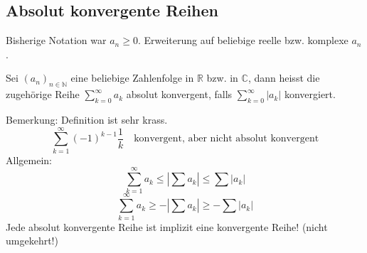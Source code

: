 
\subsection{Absolut konvergente Reihen} %
\label{sub:absolut_konvergente_reihen}

Bisherige Notation war \( a_n \geq 0 \). Erweiterung auf beliebige reelle bzw. komplexe \( a_n \). 

\begin{definition}
	Sei \( (a_n)_{n\in\mathbb{N}} \) eine beliebige Zahlenfolge in \( \mathbb{R} \) bzw. in \( \mathbb{C} \), dann heisst die zugehörige Reihe \( \sum_{k=0}^\infty a_k \) absolut konvergent, falls \( \sum_{k=0}^\infty |a_k| \) konvergiert.
\end{definition}

\noindent Bemerkung: Definition ist sehr krass.
\[
	\sum_{k=1}^\infty(-1)^{k-1}\frac{1}{k} \quad \text{konvergent, aber nicht absolut konvergent}
\]
Allgemein:
\[
	\sum_{k=1}^\infty a_k\leq|\sum a_k| \leq \sum|a_k|
\]
\[
	\sum_{k=1}^\infty a_k\geq-|\sum a_k| \geq -\sum|a_k|
\]
\noindent Jede absolut konvergente Reihe ist implizit eine konvergente Reihe! (nicht umgekehrt!)

